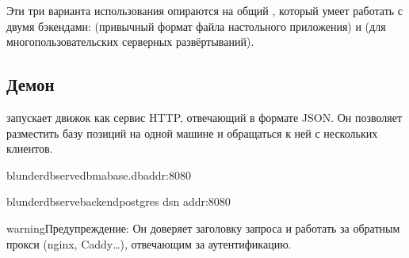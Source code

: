 \documentclass[letterpaper,10pt,russian]{sphinxmanual}
\begin{document}
\sphinxAtStartPar
Эти три варианта использования опираются на общий , который умеет работать с двумя бэкендами:  (привычный формат файла  настольного приложения) и  (для многопользовательских серверных развёртываний).


\subsection{Демон }
\label{\detokenize{mode_headless:le-demon-serve}}\label{\detokenize{mode_headless:headless-serve}}
\sphinxAtStartPar
{} запускает движок как сервис HTTP, отвечающий в формате JSON. Он позволяет разместить базу позиций на одной машине и обращаться к ней с нескольких клиентов.

\begin{sphinxVerbatim}[commandchars=\\\{\}]
blunderdbserve\PYGZhy{}\PYGZhy{}dbma\PYGZus{}base.db\PYGZhy{}\PYGZhy{}addr:8080

blunderdbserve\PYGZhy{}\PYGZhy{}backendpostgres
\PYGZhy{}\PYGZhy{}dsn
\PYGZhy{}\PYGZhy{}addr:8080
\end{sphinxVerbatim}

\begin{sphinxadmonition}{warning}{Предупреждение:}
\sphinxAtStartPar
{} Он доверяет заголовку запроса  и  работать за обратным прокси (nginx, Caddy…), отвечающим за аутентификацию. 
\end{sphinxadmonition}

\sphinxAtStartPar
{}
\end{document}
